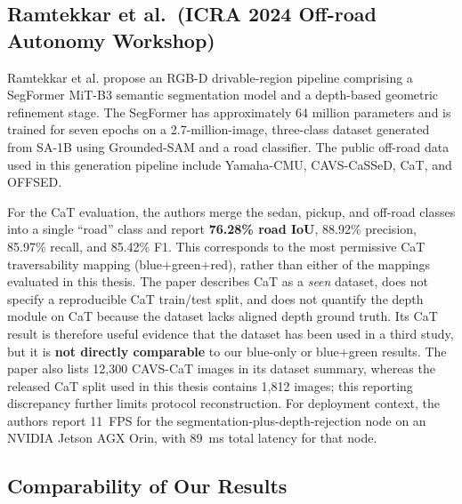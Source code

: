 \documentclass[12pt,a4paper]{report}
\begin{document}
\subsection{Ramtekkar et al.\ (ICRA 2024 Off-road Autonomy Workshop)~\cite{ramtekkar2024depth}}

Ramtekkar et al. propose an RGB-D drivable-region pipeline comprising a
SegFormer MiT-B3 semantic segmentation model and a depth-based geometric
refinement stage. The SegFormer has approximately 64 million parameters and is
trained for seven epochs on a 2.7-million-image, three-class dataset generated
from SA-1B using Grounded-SAM and a road classifier. The public off-road data
used in this generation pipeline include Yamaha-CMU, CAVS-CaSSeD, CaT, and
OFFSED.

For the CaT evaluation, the authors merge the sedan, pickup, and off-road
classes into a single ``road'' class and report \textbf{76.28\% road IoU},
88.92\% precision, 85.97\% recall, and 85.42\% F1. This corresponds to the most
permissive CaT traversability mapping (blue+green+red), rather than either of
the mappings evaluated in this thesis. The paper describes CaT as a
\emph{seen} dataset, does not specify a reproducible CaT train/test split, and
does not quantify the depth module on CaT because the dataset lacks aligned
depth ground truth. Its CaT result is therefore useful evidence that the
dataset has been used in a third study, but it is \textbf{not directly
comparable} to our blue-only or blue+green results. The paper also lists
12{,}300 CAVS-CaT images in its dataset summary, whereas the released CaT split
used in this thesis contains 1{,}812 images; this reporting discrepancy further
limits protocol reconstruction. For deployment context, the authors report
11~FPS for the segmentation-plus-depth-rejection node on an NVIDIA Jetson AGX
Orin, with 89~ms total latency for that node.

\subsection{Comparability of Our Results}
\end{document}

